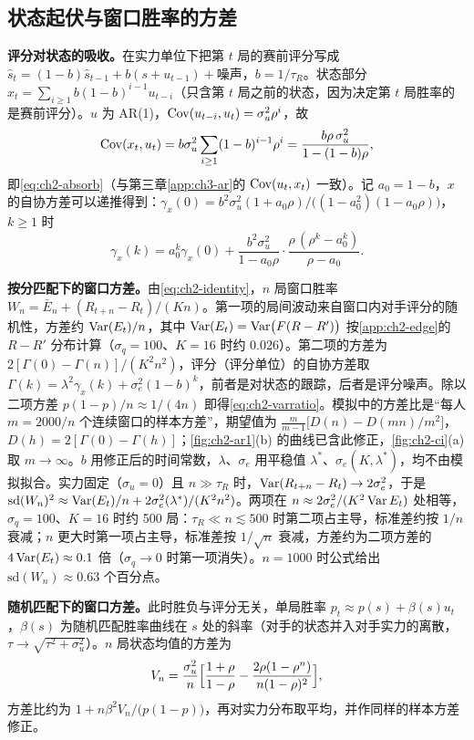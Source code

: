 \subsection{状态起伏与窗口胜率的方差}
\label{app:ch2-ar1}

\textbf{评分对状态的吸收。}在实力单位下把第 $t$ 局的赛前评分写成 $\hat s_t=(1-b)\hat s_{t-1}+b(s+u_{t-1})+$噪声，$b=1/\tau_R$。状态部分 $x_t=\sum_{i\ge1}b(1-b)^{i-1}u_{t-i}$（只含第 $t$ 局之前的状态，因为决定第 $t$ 局胜率的是赛前评分）。$u$ 为 AR(1)，$\operatorname{Cov}(u_{t-i},u_t)=\sigma_u^2\rho^i$，故
\[
  \operatorname{Cov}(x_t,u_t)=b\sigma_u^2\sum_{i\ge1}(1-b)^{i-1}\rho^i=\frac{b\rho\,\sigma_u^2}{1-(1-b)\rho},
\]
即\cref{eq:ch2-absorb}（与第三章\cref{app:ch3-ar}的 $\operatorname{Cov}(u_t,x_t)$ 一致）。记 $a_0=1-b$，$x$ 的自协方差可以递推得到：$\gamma_x(0)=b^2\sigma_u^2(1+a_0\rho)/\bigl((1-a_0^2)(1-a_0\rho)\bigr)$，$k\ge1$ 时
\[
  \gamma_x(k)=a_0^k\gamma_x(0)+\frac{b^2\sigma_u^2}{1-a_0\rho}\cdot\frac{\rho\,(\rho^k-a_0^k)}{\rho-a_0}.
\]

\textbf{按分匹配下的窗口方差。}由\cref{eq:ch2-identity}，$n$ 局窗口胜率 $W_n=\bar E_n+(R_{t+n}-R_t)/(Kn)$。第一项的局间波动来自窗口内对手评分的随机性，方差约 $\operatorname{Var}(E_t)/n$，其中 $\operatorname{Var}(E_t)=\operatorname{Var}\bigl(F(R-R')\bigr)$ 按\cref{app:ch2-edge}的 $R-R'$ 分布计算（$\sigma_q=100$、$K=16$ 时约 0.026）。第二项的方差为 $2[\Gamma(0)-\Gamma(n)]/(K^2n^2)$，评分（评分单位）的自协方差取 $\Gamma(k)=\lambda^2\gamma_x(k)+\sigma_e^2(1-b)^k$，前者是对状态的跟踪，后者是评分噪声。除以二项方差 $p(1-p)/n\approx1/(4n)$ 即得\cref{eq:ch2-varratio}。模拟中的方差比是“每人 $m=2000/n$ 个连续窗口的样本方差”，期望值为 $\frac{m}{m-1}\bigl[D(n)-D(mn)/m^2\bigr]$，$D(h)=2[\Gamma(0)-\Gamma(h)]$；\cref{fig:ch2-ar1}(b) 的曲线已含此修正，\cref{fig:ch2-ci}(a) 取 $m\to\infty$。$b$ 用修正后的时间常数，$\lambda$、$\sigma_e$ 用平稳值 $\lambda^*$、$\sigma_e(K,\lambda^*)$，均不由模拟拟合。实力固定（$\sigma_u=0$）且 $n\gg\tau_R$ 时，$\operatorname{Var}(R_{t+n}-R_t)\to2\sigma_e^2$，于是 $\mathrm{sd}(W_n)^2\approx\operatorname{Var}(E_t)/n+2\sigma_e^2(\lambda^*)/(K^2n^2)$。两项在 $n\approx2\sigma_e^2/(K^2\operatorname{Var} E_t)$ 处相等，$\sigma_q=100$、$K=16$ 时约 500 局：$\tau_R\ll n\lesssim500$ 时第二项占主导，标准差约按 $1/n$ 衰减；$n$ 更大时第一项占主导，标准差按 $1/\sqrt n$ 衰减，方差约为二项方差的 $4\operatorname{Var}(E_t)\approx0.1$ 倍（$\sigma_q\to0$ 时第一项消失）。$n=1000$ 时公式给出 $\mathrm{sd}(W_n)\approx0.63$ 个百分点。

\textbf{随机匹配下的窗口方差。}此时胜负与评分无关，单局胜率 $p_t\approx p(s)+\beta(s)u_t$，$\beta(s)$ 为随机匹配胜率曲线在 $s$ 处的斜率（对手的状态并入对手实力的离散，$\tau\to\sqrt{\tau^2+\sigma_u^2}$）。$n$ 局状态均值的方差为
\[
  V_n=\frac{\sigma_u^2}{n}\Bigl[\frac{1+\rho}{1-\rho}-\frac{2\rho(1-\rho^n)}{n(1-\rho)^2}\Bigr],
\]
方差比约为 $1+n\beta^2V_n/\bigl(p(1-p)\bigr)$，再对实力分布取平均，并作同样的样本方差修正。

